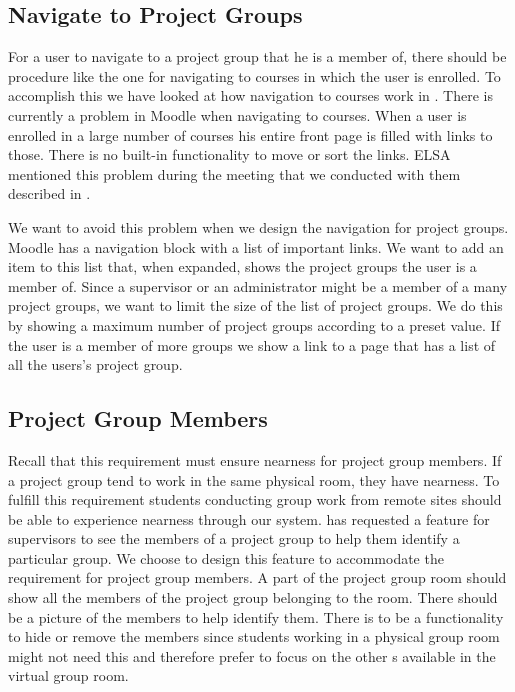 \subsection{Navigate to Project Groups}
\label{sub:designprojectgroupnavigation}
For a user to navigate to a project group that he is a member of, there should be procedure like the one for navigating to courses in which the user is enrolled.
To accomplish this we have looked at how navigation to courses work in \moodle{}.
There is currently a problem in Moodle when navigating to courses. 
When a user is enrolled in a large number of courses his entire front page is filled with links to those.
There is no built-in functionality to move or sort the links.
ELSA mentioned this problem during the meeting that we conducted with them described in .

We want to avoid this problem when we design the navigation for project groups.
Moodle has a navigation block with a list of important links.
We want to add an item to this list that, when expanded, shows the project groups the user is a member of.
Since a supervisor or an administrator might be a member of a many project groups, we want to limit the size of the list of project groups.
We do this by showing a maximum number of project groups according to a preset value.
If the user is a member of more groups we show a link to a page that has a list of all the users's project group.


\subsection{Project Group Members}
\label{sub:projGrpMembers}
Recall that this requirement must ensure nearness for project group members.
If a project group tend to work in the same physical room, they have nearness.
To fulfill this requirement students conducting group work from remote sites should be able to experience nearness through our system.
\supervisorgroup{} has requested a feature for supervisors to see the members of a project group to help them identify a particular group.
We choose to design this feature to accommodate the requirement for project group members.
A part of the project group room should show all the members of the project group belonging to the room.
There should be a picture of the members to help identify them.
There is to be a functionality to hide or remove the members since students working in a physical group room might not need this and therefore prefer to focus on the other \detdeandrelaver[]s available in the virtual group room.

